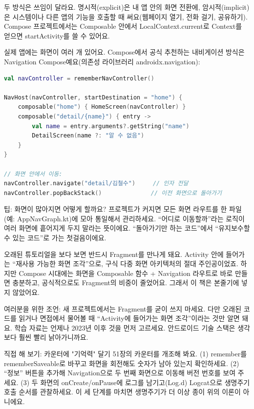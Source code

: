 두 방식은 쓰임이 달라요. 명시적(explicit)은 내 앱 안의 화면 전환에, 암시적(implicit)은 시스템이나 다른 앱의 기능을 호출할 때 써요(웹페이지 열기, 전화 걸기, 공유하기). Compose 프로젝트에서는 Composable 안에서 LocalContext.current로 Context를 얻으면 startActivity를 쓸 수 있어요.


실제 앱에는 화면이 여러 개 있어요. Compose에서 공식 추천하는 내비게이션 방식은 Navigation Compose예요(의존성 라이브러리 androidx.navigation):

\begin{lstlisting}[language=Kotlin]
val navController = rememberNavController()

NavHost(navController, startDestination = "home") {
    composable("home") { HomeScreen(navController) }
    composable("detail/{name}") { entry ->
        val name = entry.arguments?.getString("name")
        DetailScreen(name ?: "알 수 없음")
    }
}

// 화면 안에서 이동:
navController.navigate("detail/김철수")     // 인자 전달
navController.popBackStack()              // 이전 화면으로 돌아가기
\end{lstlisting}

\begin{tcbinfo}{팁: 화면이 많아지면 어떻게 할까요?}
프로젝트가 커지면 모든 화면 라우트를 한 파일(예: AppNavGraph.kt)에 모아 통일해서 관리하세요. “어디로 이동할까”라는 로직이 여러 화면에 흩어지게 두지 말라는 뜻이에요. “돌아가기만 하는 코드”에서 “유지보수할 수 있는 코드”로 가는 첫걸음이에요.

\end{tcbinfo}


오래된 튜토리얼을 보다 보면 반드시 Fragment를 만나게 돼요. Activity 안에 들어가는 “재사용 가능한 화면 조각”으로, 구식 다중 화면 아키텍처의 절대 주인공이었죠. 하지만 Compose 시대에는 화면을 Composable 함수 + Navigation 라우트로 바로 만들면 충분하고, 공식적으로도 Fragment의 비중이 줄었어요. 그래서 이 책은 본줄기에 넣지 않았어요.

여러분을 위한 조언: 새 프로젝트에서는 Fragment를 굳이 쓰지 마세요. 다만 오래된 코드를 읽거나 면접에서 물어볼 때 “Activity에 들어가는 화면 조각”이라는 것만 알면 돼요. 학습 자료는 언제나 2023년 이후 것을 먼저 고르세요. 안드로이드 기술 스택은 생각보다 훨씬 빨리 낡아가니까요.

\begin{tcbpractice}{직접 해 보기: 카운터에 "기억력" 달기}
51장의 카운터를 개조해 봐요. (1) remember를 rememberSaveable로 바꾸고 화면을 회전해도 숫자가 남아 있는지 확인하세요. (2) “정보” 버튼을 추가해 Navigation으로 두 번째 화면으로 이동해 버전 번호를 보여 주세요. (3) 두 화면의 onCreate/onPause에 로그를 남기고(Log.d) Logcat으로 생명주기 호출 순서를 관찰하세요. 이 세 단계를 마치면 생명주기가 더 이상 종이 위의 이론이 아니에요.

\end{tcbpractice}

